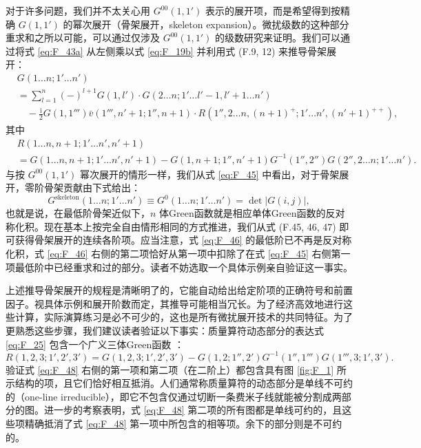 对于许多问题，我们并不太关心用 $G^{00}(1,1')$ 表示的展开项，而是希望得到按精确 $G(1,1')$ 的幂次展开（骨架展开，skeleton
expansion）。微扰级数的这种部分重求和之所以可能，可以通过仅涉及 $G^{00}(1,1')$ 的级数研究来证明。我们可以通过将式
\ref{eq:F_43a} 从左侧乘以式 \ref{eq:F_19b} 并利用式 (F.9, 12) 来推导骨架展开：
\begin{align}
 & G(1\dots n;1'\dots n')\nonumber \\
 & =\sum^{n}_{l=1}(-)^{l+1}G(1,l')\cdot G(2\dots n;1'\dots l'-1,l'+1\dots n')\nonumber \\
 & \quad-\frac{\mathrm{i}}{2}G(1,1''')\bar{v}(1''',n'+1;1'',n+1)\cdot R(1'',2\dots n,(n+1)^{+};1'\dots n',(n'+1)^{++}),\label{eq:F_45}
\end{align}
其中
\begin{align}
 & R(1\dots n,n+1;1'\dots n',n'+1)\nonumber \\
 & =G(1\dots n,n+1;1'\dots n',n'+1)-G(1,n+1;1'',n'+1)G^{-1}(1'',2'')G(2'',2\dots n;1'\dots n').\label{eq:F_46}
\end{align}
与按 $G^{00}(1,1')$ 幂次展开的情形一样，我们从式 \ref{eq:F_45} 中看出，对于骨架展开，零阶骨架贡献由下式给出：
\begin{equation}
G^{\text{skeleton}}(1\dots n;1'\dots n')\equiv G^{0}(1\dots n;1'\dots n')=\det|G(i,j)|,\label{eq:F_47}
\end{equation}
也就是说，在最低阶骨架近似下，$n$ 体Green函数就是相应单体Green函数的反对称化积。现在基本上按完全自由情形相同的方式推进，我们从式
(F.45, 46, 47) 即可获得骨架展开的连续各阶项。应当注意，式 \ref{eq:F_46} 的最低阶已不再是反对称化积，式
\ref{eq:F_46} 右侧的第二项恰好从第一项中扣除了在式 \ref{eq:F_45} 右侧第一项最低阶中已经重求和过的部分。读者不妨选取一个具体示例亲自验证这一事实。

上述推导骨架展开的规程是清晰明了的，它能自动给出给定阶项的正确符号和前置因子。视具体示例和展开阶数而定，其推导可能相当冗长。为了经济高效地进行这些计算，实际演算练习是必不可少的，这也是所有微扰展开技术的共同特征。为了更熟悉这些步骤，我们建议读者验证以下事实：质量算符动态部分的表达式
\ref{eq:F_25} 包含一个广义三体Green函数 \cite{ES69}：
\begin{equation}
R(1,2,3;1',2',3')=G(1,2,3;1',2',3')-G(1,2;1'',2')G^{-1}(1'',1''')G(1''',3;1',3').\label{eq:F_48}
\end{equation}
验证式 \ref{eq:F_48} 右侧的第一项和第二项（在二阶上）都包含具有图 \ref{fig:F_1} 所示结构的项，且它们恰好相互抵消。人们通常称质量算符的动态部分是单线不可约的（one-line
irreducible），即它不包含仅通过切断一条费米子线就能被分割成两部分的图。进一步的考察表明，式 \ref{eq:F_48}
第二项的所有图都是单线可约的，且这些项精确抵消了式 \ref{eq:F_48} 第一项中所包含的相等项。余下的部分则是不可约的。


